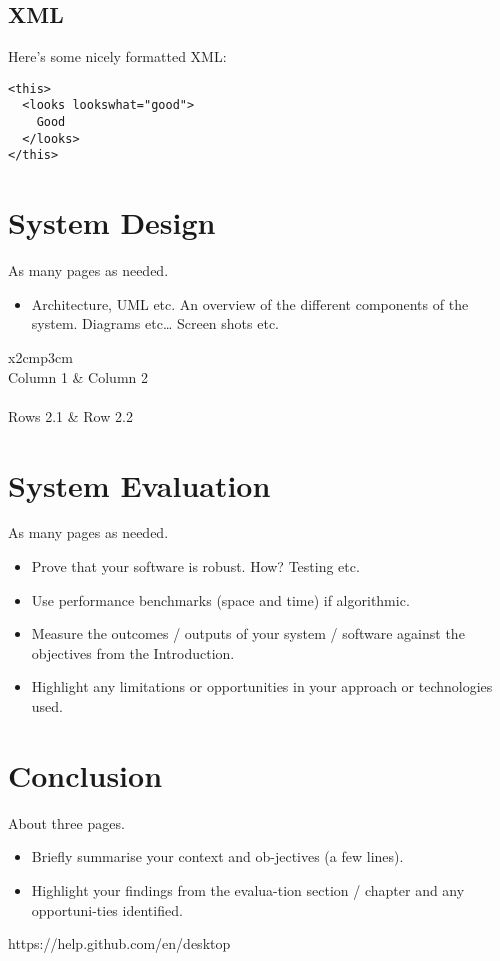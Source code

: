 \section{XML}
Here's some nicely formatted XML:
\begin{verbatim}
<this>
  <looks lookswhat="good">
    Good
  </looks>
</this>
\end{verbatim}

\chapter{System Design}
As many pages as needed.
\begin{itemize}
\item Architecture, UML etc. An overview of the different components of the system. Diagrams etc… Screen shots etc.
\end{itemize}

\begin{table}[h]
  \centering
  \begin{tabular}{x{2cm}p{3cm}}
    \toprule \\
    Column 1 & Column 2 \\
    \midrule \\
    Rows 2.1 & Row 2.2 \\
    \bottomrule
  \end{tabular}
  \caption{A table.}
  \label{table:mytable}
\end{table}

\chapter{System Evaluation}
As many pages as needed.
\begin{itemize}
\item Prove that your software is robust. How? Testing etc. 
\item Use performance benchmarks (space and time) if algorithmic.
\item Measure the outcomes / outputs of your system / software against the objectives from the Introduction.
\item Highlight any limitations or opportunities in your approach or technologies used.
\end{itemize}

\chapter{Conclusion}
About three pages.

\begin{itemize}
\item Briefly summarise your context and ob-jectives (a few lines).
\item Highlight your findings from the evalua-tion section / chapter and any opportuni-ties identified.
\end{itemize}

https://help.github.com/en/desktop


